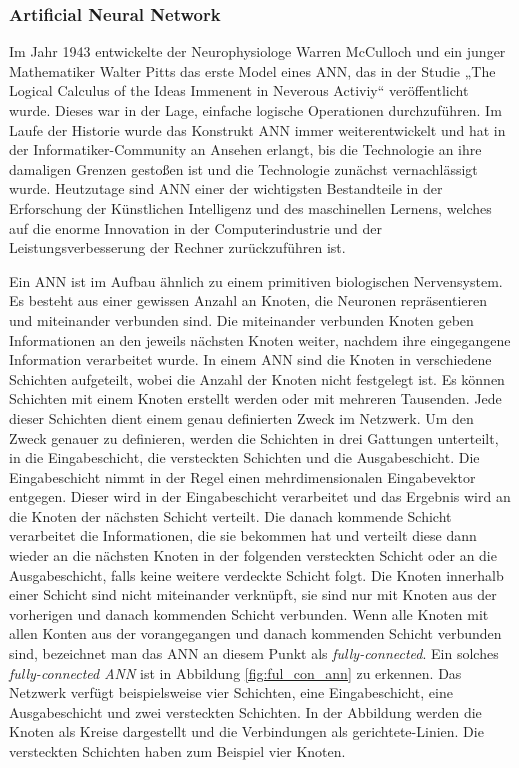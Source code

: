\subsubsection{Artificial Neural Network}
Im Jahr 1943 entwickelte der Neurophysiologe Warren McCulloch und ein junger Mathematiker Walter Pitts das erste Model eines ANN, das in der Studie „The Logical Calculus of the Ideas Immenent in Neverous Activiy“ veröffentlicht wurde. Dieses war in der Lage, einfache logische Operationen durchzuführen.
Im Laufe der Historie wurde das Konstrukt ANN immer weiterentwickelt und hat in der Informatiker-Community an Ansehen erlangt, bis die Technologie an ihre damaligen Grenzen gestoßen ist und die Technologie zunächst vernachlässigt wurde.
Heutzutage sind ANN einer der wichtigsten Bestandteile in der Erforschung der Künstlichen Intelligenz und des maschinellen Lernens, welches auf die enorme Innovation in der Computerindustrie und der Leistungsverbesserung der Rechner zurückzuführen ist. \cite*{10.1007/978-3-319-45378-1_1}

Ein ANN ist im Aufbau ähnlich zu einem primitiven biologischen Nervensystem. Es besteht aus einer gewissen Anzahl an Knoten, die Neuronen repräsentieren und miteinander verbunden sind. Die miteinander verbunden Knoten geben Informationen an den jeweils nächsten Knoten weiter, nachdem ihre eingegangene Information verarbeitet wurde.
In einem ANN sind die Knoten in verschiedene Schichten aufgeteilt, wobei die Anzahl der Knoten nicht festgelegt ist. Es können Schichten mit einem Knoten erstellt werden oder mit mehreren Tausenden. Jede dieser Schichten dient einem genau definierten Zweck im Netzwerk. Um den Zweck genauer zu definieren, werden die Schichten in drei Gattungen unterteilt, in die Eingabeschicht, die versteckten Schichten und die Ausgabeschicht. Die Eingabeschicht nimmt in der Regel einen mehrdimensionalen Eingabevektor entgegen. Dieser wird in der Eingabeschicht verarbeitet und das Ergebnis wird an die Knoten der nächsten Schicht verteilt. Die danach kommende Schicht verarbeitet die Informationen, die sie bekommen hat und verteilt diese dann wieder an die nächsten Knoten in der folgenden versteckten Schicht oder an die Ausgabeschicht, falls keine weitere verdeckte Schicht folgt.
Die Knoten innerhalb einer Schicht sind nicht miteinander verknüpft, sie sind nur mit Knoten aus der vorherigen und danach kommenden Schicht verbunden. Wenn alle Knoten mit allen Konten aus der vorangegangen und danach kommenden Schicht verbunden sind, bezeichnet man das ANN an diesem Punkt als \textit{fully-connected}. Ein solches \textit{fully-connected ANN} ist in Abbildung \ref{fig:ful_con_ann} zu erkennen. Das Netzwerk verfügt beispielsweise vier Schichten, eine Eingabeschicht, eine Ausgabeschicht und zwei versteckten Schichten. In der Abbildung werden die Knoten als Kreise dargestellt und die Verbindungen als gerichtete-Linien. Die versteckten Schichten haben zum Beispiel vier Knoten.
\cite*{Keiron2015}

